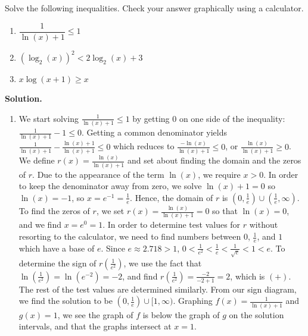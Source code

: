 \begin{ex}  Solve the following inequalities.  Check your answer graphically using a calculator.
\label{logineq}

\begin{multicols}{3}

\begin{enumerate}

\item  $\dfrac{1}{\ln(x)+1} \leq 1$

\item  $\left(\log_{2}(x)\right)^2 < 2 \log_{2}(x) + 3$

\item  $x \log(x+1) \geq x$


\end{enumerate}

\end{multicols}


{\bf Solution.}  

\begin{enumerate}

\item  We start solving $\frac{1}{\ln(x)+1} \leq 1$ by getting $0$ on one side of the inequality: $\frac{1}{\ln(x)+1}  - 1 \leq 0$.  Getting a common denominator yields $\frac{1}{\ln(x)+1}  - \frac{\ln(x)+1}{\ln(x)+1} \leq 0$ which reduces to $\frac{-\ln(x)}{\ln(x)+1} \leq 0$, or $ \frac{\ln(x)}{\ln(x)+1} \geq 0$.  We define $r(x) = \frac{\ln(x)}{\ln(x)+1}$ and set about finding the domain and the zeros of $r$.  Due to the appearance of the term $\ln(x)$, we require  $x > 0$.  In order to keep the denominator away from zero, we solve $\ln(x)+1 = 0$ so $\ln(x) = -1$, so $x = e^{-1} = \frac{1}{e}$.  Hence, the domain of $r$ is $\left(0, \frac{1}{e}\right) \cup \left(\frac{1}{e}, \infty\right)$.  To find the zeros of $r$, we set $r(x) = \frac{\ln(x)}{\ln(x)+1} = 0$ so that $\ln(x) = 0$, and we find $x = e^{0} = 1$.  In order to determine test values for $r$ without resorting to the calculator, we need to find numbers between $0$, $\frac{1}{e}$, and $1$ which have a base of $e$.  Since $e \approx 2.718 > 1$, $0 < \frac{1}{e^2} < \frac{1}{e} < \frac{1}{\sqrt{e}} < 1 < e$.  To determine the sign of $r\left( \frac{1}{e^2} \right)$, we use the fact that $\ln\left(\frac{1}{e^2}\right) = \ln\left(e^{-2}\right) = -2$, and find $r\left( \frac{1}{e^2} \right) = \frac{-2}{-2+1} = 2$, which is $(+)$.  The rest of the test values are determined similarly.   From our sign diagram, we find the solution to be $\left(0, \frac{1}{e}\right) \cup [1, \infty)$. Graphing $f(x) =  \frac{1}{\ln(x)+1}$ and $g(x) = 1$, we see the graph of $f$ is below the graph of $g$ on the solution intervals, and that the graphs intersect at $x=1$.


\end{enumerate}
\end{ex}
